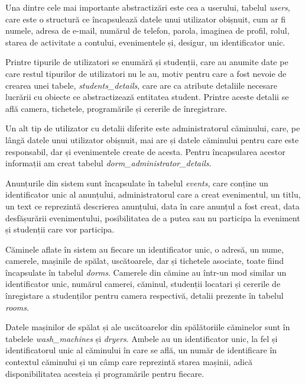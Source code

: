 \documentclass[12pt,a4paper]{report}
\theoremstyle{definition}
\theoremstyle{remark}
\begin{document}
\par Una dintre cele mai importante abstractizări este cea a userului, tabelul \textit{users}, care este o structură ce încapsulează datele unui utilizator obișnuit, cum ar fi numele, adresa de e-mail, numărul de telefon, parola, imaginea de profil, rolul, starea de activitate a contului, evenimentele și, desigur, un identificator unic.



\par Printre tipurile de utilizatori se enumără și studenții, care au anumite date pe care restul tipurilor de utilizatori nu le au, motiv pentru care a fost nevoie de crearea unei tabele, \textit{students\_details}, care are ca atribute detaliile necesare lucrării cu obiecte ce abstractizează entitatea student. Printre aceste detalii se află camera, tichetele, programările și cererile de înregistrare.

\par Un alt tip de utilizator cu detalii diferite este administratorul căminului, care, pe lângă datele unui utilizator obișnuit, mai are și datele căminului pentru care este responsabil, dar și evenimentele create de acesta. Pentru încapsularea acestor informații am creat tabelul \textit{dorm\_administrator\_details}.

\par Anunțurile din sistem sunt încapsulate în tabelul \textit{events}, care conține un identificator unic al anunțului, administratorul care a creat evenimentul, un titlu, un text ce reprezintă descrierea anunțului, data în care anunțul a fost creat, data desfășurării evenimentului, posibilitatea de a putea sau nu participa la eveniment și studenții care vor participa.

\par Căminele aflate în sistem au fiecare un identificator unic, o adresă, un nume, camerele, mașinile de spălat, uscătoarele, dar și tichetele asociate, toate fiind încapsulate în tabelul \textit{dorms}. Camerele din cămine au într-un mod similar un identificator unic, numărul camerei, căminul, studenții locatari și cererile de înregistare a studenților pentru camera respectivă, detalii prezente în tabelul \textit{rooms}.

\par Datele mașinilor de spălat și ale uscătoarelor din spălătoriile căminelor sunt în tabelele \textit{wash\_machines} și \textit{dryers}. Ambele au un identificator unic, la fel și identificatorul unic al căminului în care se află, un număr de identificare în contextul căminului și un câmp care reprezintă starea mașinii, adică disponibilitatea acesteia și programările pentru fiecare.
\end{document}
